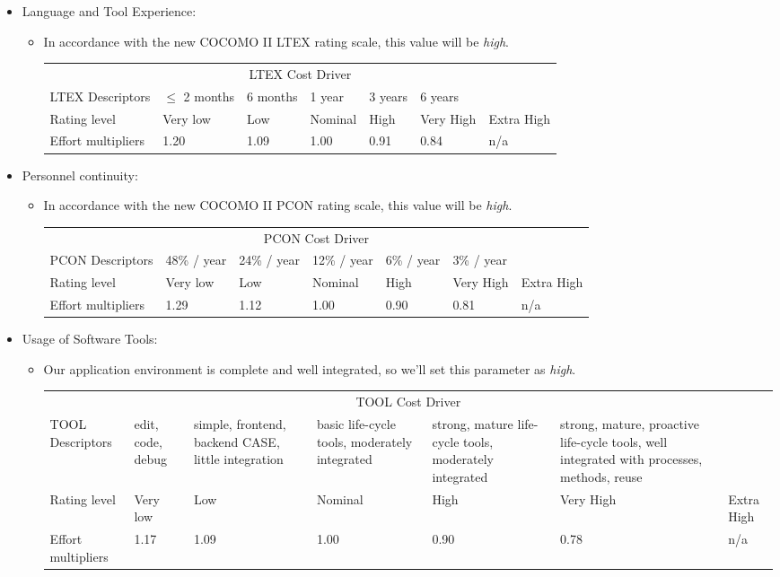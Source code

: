 \documentclass[english]{article}
\newenvironment{costdriverstable}[1]{
	\setlength{\LTleft}{-40pt}
	\begin{longtable}{|p{\dimexpr.16\textwidth}|p{\dimexpr.14\textwidth}|p{\dimexpr.14\textwidth}|p{\dimexpr.14\textwidth}|p{\dimexpr.14\textwidth}|p{\dimexpr.14\textwidth}|p{\dimexpr.14\textwidth}|}
	\hline
	\multicolumn{7}{|c|}{{#1}}\\\hhline{|=======|}
}{
	\hline\end{longtable}
}
\newcommand{\costdescriptors}[7]{
	#1 & #2 & #3 & #4 & #5 & #6 & #7\\
}
\newcommand{\ratinglevel}[6]{
	Rating level & #1 & #2 & #3 & #4 & #5 & #6 \\\hline
}
\newcommand{\effortmultipliers}[6]{
	Effort multipliers & #1 & #2 & #3 & #4 & #5 & #6 \\\hline
}
\begin{document}
\begin{itemize}
	\item Language and Tool Experience: 
	\begin{itemize}
	\item[]  In accordance with the new COCOMO II LTEX rating scale, this value will be \textit{high}.
	\begin{costdriverstable}{LTEX Cost Driver}
		\costdescriptors{LTEX Descriptors}{$\le$ 2 months}{6 months}{1 year}{3 years}{6 years}{}\hline
		\ratinglevel{Very low}{Low}{Nominal}{High}{Very High}{Extra High}
		\effortmultipliers{1.20}{1.09}{1.00}{0.91}{0.84}{n/a}
	\end{costdriverstable}
	\end{itemize}
\end{itemize}

\pagebreak
\begin{itemize}
	\item Personnel continuity: 
	\begin{itemize}
	\item[]  In accordance with the new COCOMO II PCON rating scale, this value will be \textit{high}. 
	\begin{costdriverstable}{PCON Cost Driver}
		\costdescriptors{PCON Descriptors}{48\% / year}{24\% / year}{12\% / year}{6\% / year}{3\% / year}{}\hline	
		\ratinglevel{Very low}{Low}{Nominal}{High}{Very High}{Extra High}
		\effortmultipliers{1.29}{1.12}{1.00}{0.90}{0.81}{n/a}
	\end{costdriverstable}
	\end{itemize}
\end{itemize}

\begin{itemize}
	\item Usage of Software Tools: 
	\begin{itemize}
	\item[] Our application environment is complete and well integrated, so we'll set this parameter as \textit{high}. 
	\begin{costdriverstable}{TOOL Cost Driver}
		\costdescriptors{TOOL Descriptors}{edit, code, debug}{simple, frontend, backend CASE, little integration}{basic life-cycle tools, moderately integrated}{strong, mature life-cycle tools, moderately integrated}{strong, mature, proactive life-cycle tools, well integrated with processes, methods, reuse}{}\hline
		\ratinglevel{Very low}{Low}{Nominal}{High}{Very High}{Extra High}
		\effortmultipliers{1.17}{1.09}{1.00}{0.90}{0.78}{n/a}	
	\end{costdriverstable}
	\end{itemize}
\end{itemize}
\end{document}
